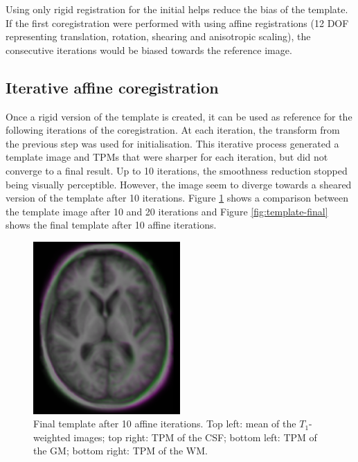 Using only rigid registration for the initial helps reduce the bias of the template. If the first coregistration were performed with using affine registrations (12 DOF representing translation, rotation, shearing and anisotropic scaling), the consecutive iterations would be biased towards the reference image.


\subsection{Iterative affine coregistration}
Once a rigid version of the template is created, it can be used as reference for the following iterations of the coregistration. At each iteration, the transform from the previous step was used for initialisation. This iterative process generated a template image and TPMs that were sharper for each iteration, but did not converge to a final result. Up to 10 iterations, the smoothness reduction stopped being visually perceptible. However, the image seem to diverge towards a sheared version of the template after 10 iterations. Figure \ref{fig:template-sheared} shows a comparison between the template image after 10 and 20 iterations and Figure \ref{fig:template-final} shows the final template after 10 affine iterations.


\begin{figure}
  \includegraphics[width=0.5\textwidth]{figures/template_sheared}
  \centering
  \caption{Final template after 10 affine iterations. Top left: mean of the $T_1$-weighted images; top right: TPM of the CSF; bottom left: TPM of the GM; bottom right: TPM of the WM.}
  \label{fig:template-sheared}
\end{figure}



